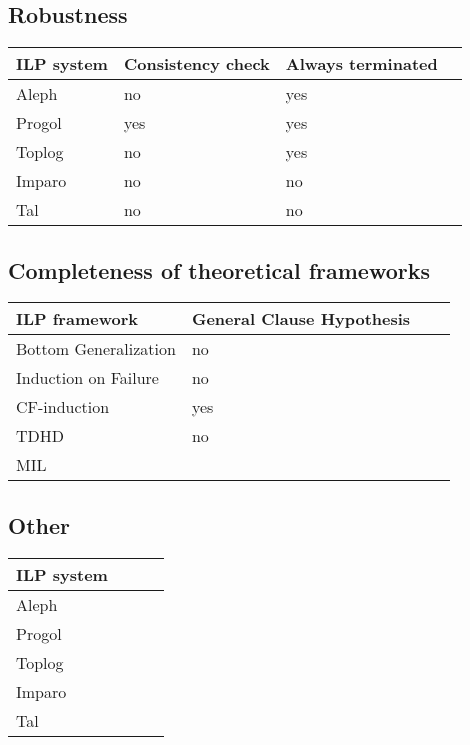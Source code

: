 \subsection{Robustness}
\begin{center}
    \begin{tabular}{ | l | l | l | p{5cm} |}
    \hline
    ILP system & Consistency check & Always terminated\\ \hline
    Aleph & no & yes\\ \hline
    Progol & yes & yes\\ \hline
    Toplog & no & yes\\ \hline
    Imparo & no & no\\ \hline
    Tal & no & no\\ \hline
    \hline
    \end{tabular}
\end{center}

\subsection{Completeness of theoretical frameworks}
    \begin{tabular}{ | l | l | l | p{5cm} |}
    \hline
    ILP framework & General Clause Hypothesis\\ \hline
    Bottom Generalization & no\\ \hline
    Induction on Failure & no\\ \hline
    CF-induction & yes\\ \hline
    TDHD & no\\ \hline
    MIL & \\ \hline
    \hline
    \end{tabular}

\subsection{Other}
\begin{center}
    \begin{tabular}{ | l | l | l | p{5cm} |}
    \hline
    ILP system & \\ \hline
    Aleph & \\ \hline
    Progol & \\ \hline
    Toplog & \\ \hline
    Imparo & \\ \hline
    Tal & \\ \hline
    \hline
    \end{tabular}
\end{center}